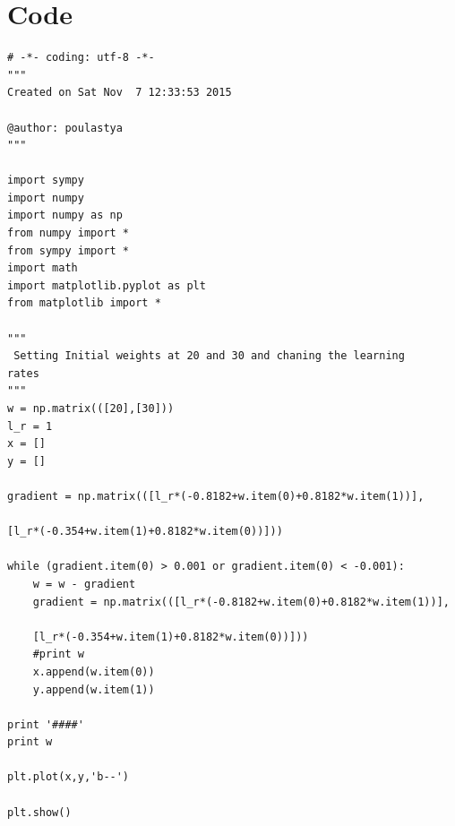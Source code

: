 \documentclass[paper=a4, fontsize=11pt]{scrartcl} %
\begin{document}
\section{Code}
\begin{verbatim}
# -*- coding: utf-8 -*-
"""
Created on Sat Nov  7 12:33:53 2015

@author: poulastya
"""

import sympy
import numpy
import numpy as np
from numpy import *
from sympy import *
import math
import matplotlib.pyplot as plt
from matplotlib import *

"""
 Setting Initial weights at 20 and 30 and chaning the learning
rates
"""
w = np.matrix(([20],[30]))
l_r = 1
x = []
y = []

gradient = np.matrix(([l_r*(-0.8182+w.item(0)+0.8182*w.item(1))],

[l_r*(-0.354+w.item(1)+0.8182*w.item(0))]))

while (gradient.item(0) > 0.001 or gradient.item(0) < -0.001):
    w = w - gradient
    gradient = np.matrix(([l_r*(-0.8182+w.item(0)+0.8182*w.item(1))],
    
    [l_r*(-0.354+w.item(1)+0.8182*w.item(0))]))
    #print w    
    x.append(w.item(0))
    y.append(w.item(1))

print '####'
print w    

plt.plot(x,y,'b--')

plt.show()
\end{verbatim}
\end{document}
